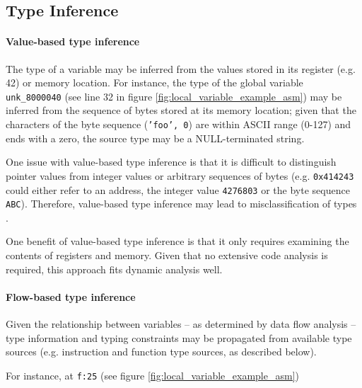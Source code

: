 
\subsection{Type Inference}


\paragraph{Value-based type inference}

The type of a variable may be inferred from the values stored in its register (e.g. 42) or memory location. For instance, the type of the global variable \texttt{unk\_8000040} (see line 32 in figure \ref{fig:local_variable_example_asm}) may be inferred from the sequence of bytes stored at its memory location; given that the characters of the byte sequence (\texttt{'foo', 0}) are within ASCII range (0-127) and ends with a zero, the source type may be a NULL-terminated string.

One issue with value-based type inference is that it is difficult to distinguish pointer values from integer values or arbitrary sequences of bytes (e.g. \texttt{0x414243} could either refer to an address, the integer value \texttt{4276803} or the byte sequence \texttt{ABC}). Therefore, value-based type inference may lead to misclassification of types \cite{type_inference_on_executables}.

One benefit of value-based type inference is that it only requires examining the contents of registers and memory. Given that no extensive code analysis is required, this approach fits dynamic analysis well.


\paragraph{Flow-based type inference}

Given the relationship between variables -- as determined by data flow analysis -- type information and typing constraints may be propagated from available type sources (e.g. instruction and function type sources, as described below).

For instance, at \texttt{f:25} (see figure \ref{fig:local_variable_example_asm}) 


